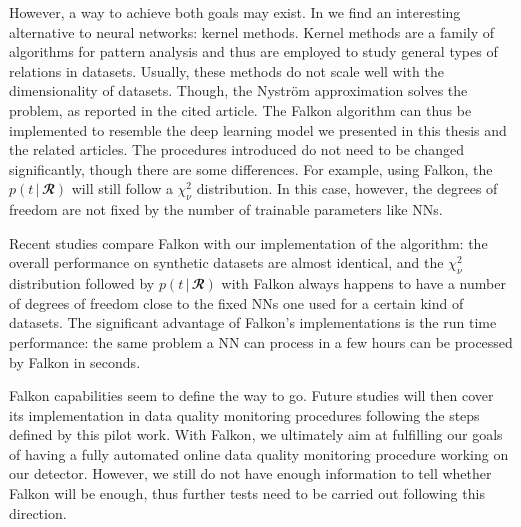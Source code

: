 However, a way to achieve both goals may exist. In \cite{falkon} we find an interesting alternative to neural networks:
kernel methods. Kernel methods are a family of algorithms for pattern analysis and thus are employed to study general
types of relations in datasets. Usually, these methods do not scale well with the dimensionality of datasets. Though,
the Nystr\"{o}m approximation solves the problem, as reported in the cited article. The Falkon algorithm can thus be
implemented to resemble the deep learning model we presented in this thesis and the related articles. The procedures
introduced do not need to be changed significantly, though there are some differences. For example, using Falkon, the
$p(t\,|\,\mathbfcal{R})$ will still follow a $\chi^2_{\nu}$ distribution. In this case, however, the degrees of freedom
are not fixed by the number of trainable parameters like NNs.

Recent studies compare Falkon with our implementation of the algorithm: the overall performance on synthetic datasets
are almost identical, and the $\chi^2_{\nu}$ distribution followed by $p(t\,|\,\mathbfcal{R})$ with Falkon always
happens to have a number of degrees of freedom close to the fixed NNs one used for a certain kind of datasets. The
significant advantage of Falkon's implementations is the run time performance: the same problem a NN can process in a
few hours can be processed by Falkon in seconds.

Falkon capabilities seem to define the way to go. Future studies will then cover its implementation in data quality
monitoring procedures following the steps defined by this pilot work. With Falkon, we ultimately aim at fulfilling our
goals of having a fully automated online data quality monitoring procedure working on our detector. However, we still do
not have enough information to tell whether Falkon will be enough, thus further tests need to be carried out following
this direction. 
